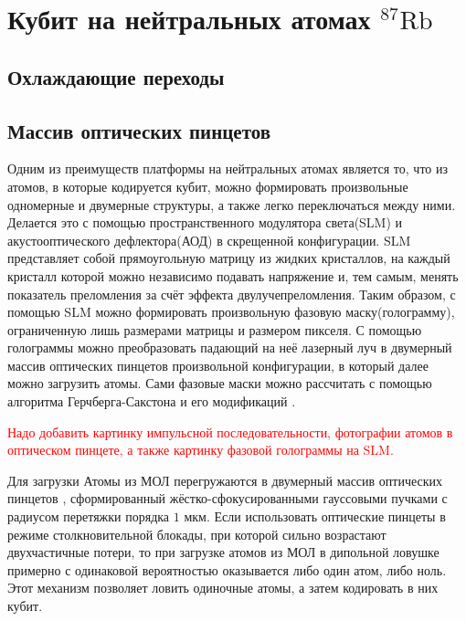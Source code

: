 \section{Кубит на нейтральных атомах $^{87}\text{Rb}$}
\label{sec:chapter_2}

\subsection{Охлаждающие переходы}


\subsection{Массив оптических пинцетов}

Одним из преимуществ платформы на нейтральных атомах является то, что из атомов, в которые кодируется кубит, можно формировать произвольные одномерные и двумерные структуры, а также легко переключаться между ними. Делается это с помощью пространственного модулятора света(SLM) и акустооптического дефлектора(АОД) в скрещенной конфигурации. SLM представляет собой прямоугольную матрицу из жидких кристаллов, на каждый кристалл которой можно независимо подавать напряжение и, тем самым, менять показатель преломления за счёт эффекта двулучепреломления. Таким образом, с помощью SLM можно формировать произвольную фазовую маску(голограмму), ограниченную лишь размерами матрицы и размером пикселя. С помощью голограммы можно преобразовать падающий на неё лазерный луч в двумерный массив оптических пинцетов произвольной конфигурации, в который далее можно загрузить атомы. Сами фазовые маски можно рассчитать с помощью алгоритма Герчберга-Сакстона\cite{Gerchberg1972APA} и его модификаций \cite{robust_masks,Zupancic:16}.

\textcolor{red}{Надо добавить картинку импульсной последовательности, фотографии атомов в оптическом пинцете, а также картинку фазовой голограммы на SLM.}

Для загрузки Атомы из МОЛ перегружаются в двумерный массив оптических пинцетов \cite{Ashkin:99}, сформированный жёстко-сфокусированными гауссовыми пучками с радиусом перетяжки порядка $1 \text{ мкм}$. Если использовать оптические пинцеты в режиме столкновительной блокады\cite{Schlosser_Grangier,Kuppens_Wieman}, при которой сильно возрастают двухчастичные потери, то при загрузке атомов из МОЛ в дипольной ловушке примерно с одинаковой вероятностью оказывается либо один атом, либо ноль. Этот механизм позволяет ловить одиночные атомы, а затем кодировать в них кубит. 



